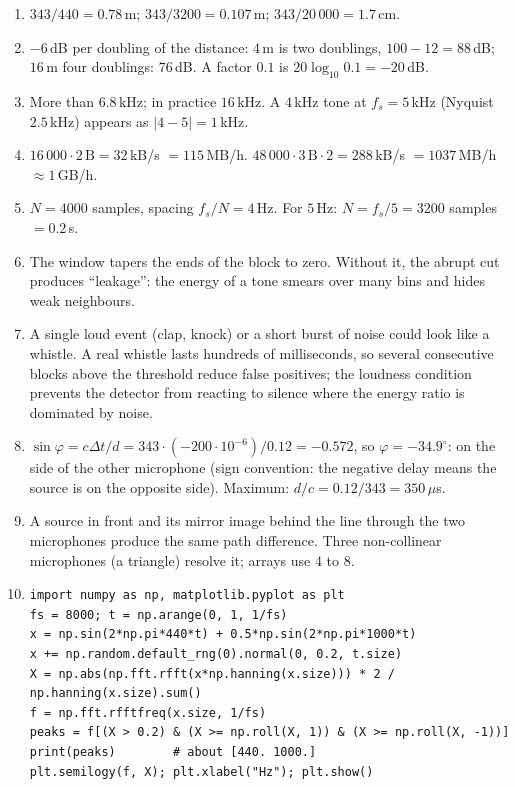 \begin{enumerate}[label=\textbf{\ansnum.\arabic*}]
  \item $343/440=0.78$\,m; $343/3200=0.107$\,m; $343/20\,000=1.7$\,cm.
  \item $-6$\,dB per doubling of the distance: $4$\,m is two doublings, $100-12=88$\,dB; $16$\,m four doublings: $76$\,dB. A factor $0.1$ is $20\log_{10}0.1=-20$\,dB.
  \item More than $6.8$\,kHz; in practice $16$\,kHz. A $4$\,kHz tone at $f_s=5$\,kHz (Nyquist $2.5$\,kHz) appears as $|4-5|=1$\,kHz.
  \item $16\,000\cdot2\,\text{B}=32$\,kB/s $=115$\,MB/h. $48\,000\cdot3\,\text{B}\cdot2=288$\,kB/s $=1037$\,MB/h $\approx1$\,GB/h.
  \item $N=4000$ samples, spacing $f_s/N=4$\,Hz. For $5$\,Hz: $N=f_s/5=3200$ samples $=0.2$\,s.
  \item The window tapers the ends of the block to zero. Without it, the abrupt cut produces ``leakage'': the energy of a tone smears over many bins and hides weak neighbours.
  \item A single loud event (clap, knock) or a short burst of noise could look like a whistle. A real whistle lasts hundreds of milliseconds, so several consecutive blocks above the threshold reduce false positives; the loudness condition prevents the detector from reacting to silence where the energy ratio is dominated by noise.
  \item $\sin\varphi=c\Delta t/d=343\cdot(-200\cdot10^{-6})/0.12=-0.572$, so $\varphi=-34.9^\circ$: on the side of the other microphone (sign convention: the negative delay means the source is on the opposite side). Maximum: $d/c=0.12/343=350\,\mu$s.
  \item A source in front and its mirror image behind the line through the two microphones produce the same path difference. Three non-collinear microphones (a triangle) resolve it; arrays use $4$ to $8$.
  \item[\textbf{\ansnum.10}]
\begin{verbatim}
import numpy as np, matplotlib.pyplot as plt
fs = 8000; t = np.arange(0, 1, 1/fs)
x = np.sin(2*np.pi*440*t) + 0.5*np.sin(2*np.pi*1000*t)
x += np.random.default_rng(0).normal(0, 0.2, t.size)
X = np.abs(np.fft.rfft(x*np.hanning(x.size))) * 2 / np.hanning(x.size).sum()
f = np.fft.rfftfreq(x.size, 1/fs)
peaks = f[(X > 0.2) & (X >= np.roll(X, 1)) & (X >= np.roll(X, -1))]
print(peaks)        # about [440. 1000.]
plt.semilogy(f, X); plt.xlabel("Hz"); plt.show()
\end{verbatim}
\end{enumerate}
